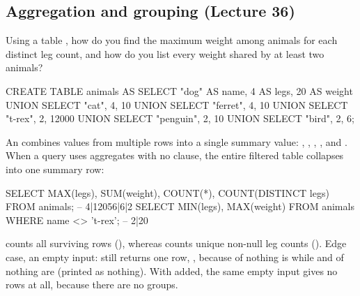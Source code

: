 \documentclass[10pt]{scrartcl}
\begin{document}
\subsection{Aggregation and grouping (Lecture 36)}

\begin{qbox}
  Using a table , how do you find the maximum weight among animals for each distinct leg count, and how do you list every weight shared by at least two animals?
\end{qbox}

\begin{sql}
CREATE TABLE animals AS
  SELECT "dog" AS name, 4 AS legs, 20 AS weight UNION
  SELECT "cat",         4,         10           UNION
  SELECT "ferret",      4,         10           UNION
  SELECT "t-rex",       2,         12000        UNION
  SELECT "penguin",     2,         10           UNION
  SELECT "bird",        2,         6;
\end{sql}
An  combines values from multiple rows into a single summary value: , , , , and . When a query uses aggregates with no  clause, the entire filtered table collapses into one summary row:
\begin{sql}
SELECT MAX(legs), SUM(weight), COUNT(*), COUNT(DISTINCT legs) FROM animals;  -- 4|12056|6|2
SELECT MIN(legs), MAX(weight) FROM animals WHERE name <> 't-rex';            -- 2|20
\end{sql}
 counts all surviving rows (), whereas  counts unique non-null leg counts (). Edge case, an empty input:  still returns one row, , because  of nothing is  while  and  of nothing are  (printed as nothing). With  added, the same empty input gives no rows at all, because there are no groups.
\end{document}

